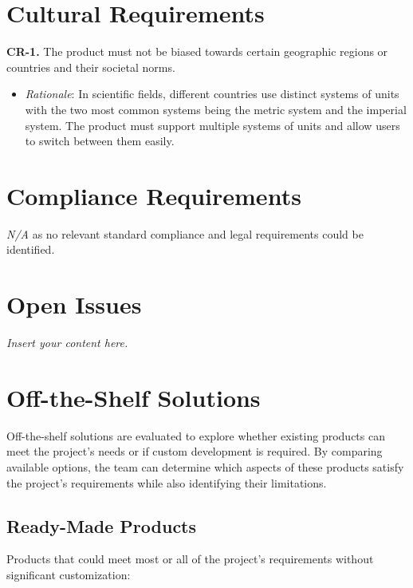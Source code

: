 \documentclass[12pt]{article}
\newcommand{\lips}{\textit{Insert your content here.}}
\begin{document}
\section{Cultural Requirements}
\textbf{CR-1.} The product must not be biased towards certain geographic regions or countries and their societal norms.
\begin{itemize}
  \item \emph{Rationale}: In scientific fields, different countries use distinct systems of units with the two most
  common systems being the metric system and the imperial system. The product must support multiple systems of units
  and allow users to switch between them easily.
\end{itemize}

\section{Compliance Requirements}
\emph{N/A} as no relevant standard compliance and legal requirements could be identified.

\section{Open Issues}
\lips
\section{Off-the-Shelf Solutions}

Off-the-shelf solutions are evaluated to explore whether existing products can
meet the project’s needs or if custom development is required. By comparing
available options, the team can determine which aspects of these products
satisfy the project's requirements while also identifying their limitations.

\subsection{Ready-Made Products}

Products that could meet most or all of the project’s requirements without
significant customization:
\end{document}
